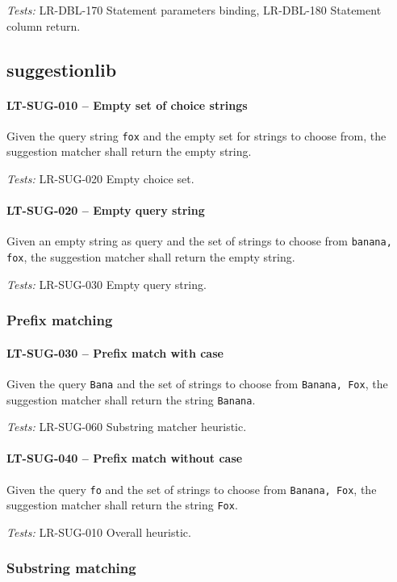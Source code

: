 \textit{Tests: } LR-DBL-170 Statement parameters binding, LR-DBL-180 Statement
column return.

\subsection{suggestion\textunderscore lib}
\paragraph{LT-SUG-010 -- Empty set of choice strings}
Given the query string \lstinline{fox} and the empty set for strings
to choose from, the suggestion matcher shall return the empty string.

\textit{Tests: } LR-SUG-020 Empty choice set.

\paragraph{LT-SUG-020 -- Empty query string}
Given an empty string as query and the set of strings to choose
from \lstinline{banana, fox}, the suggestion matcher shall
return the empty string.

\textit{Tests: } LR-SUG-030 Empty query string.

\subsubsection{Prefix matching}
\paragraph{LT-SUG-030 -- Prefix match with case}
Given the query \lstinline{Bana} and the set of strings to choose
from \lstinline{Banana, Fox}, the suggestion matcher shall
return the string \lstinline{Banana}.

\textit{Tests: } LR-SUG-060 Substring matcher heuristic.

\paragraph{LT-SUG-040 -- Prefix match without case}
Given the query \lstinline{fo} and the set of strings to choose from
\lstinline{Banana, Fox}, the suggestion matcher shall return
the string \lstinline{Fox}.

\textit{Tests: } LR-SUG-010 Overall heuristic.

\subsubsection{Substring matching}

